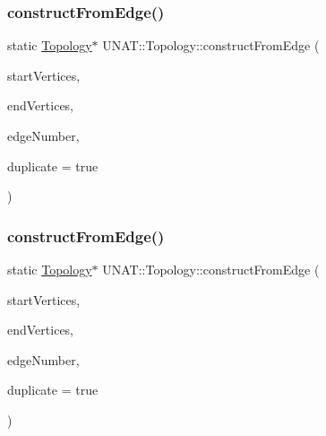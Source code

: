 \subsubsection{\texorpdfstring{constructFromEdge()}{constructFromEdge()}\hspace{0.1cm}{\footnotesize\ttfamily [1/3]}}
{\footnotesize\ttfamily static \mbox{\hyperlink{classUNAT_1_1Topology}{Topology}}$\ast$ U\+N\+A\+T\+::\+Topology\+::construct\+From\+Edge (\begin{DoxyParamCaption}\item[{\mbox{\hyperlink{include_2swMacro_8h_a113cf5f6b5377cdf3fac6aa4e443e9aa}{sw\+Int}} $\ast$}]{start\+Vertices,  }\item[{\mbox{\hyperlink{include_2swMacro_8h_a113cf5f6b5377cdf3fac6aa4e443e9aa}{sw\+Int}} $\ast$}]{end\+Vertices,  }\item[{\mbox{\hyperlink{include_2swMacro_8h_a113cf5f6b5377cdf3fac6aa4e443e9aa}{sw\+Int}}}]{edge\+Number,  }\item[{bool}]{duplicate = {\ttfamily true} }\end{DoxyParamCaption})\hspace{0.3cm}{\ttfamily [static]}}

\mbox{\label{classUNAT_1_1Topology_abe162cf4b45297f8f022db63c11140d1}} 
\subsubsection{\texorpdfstring{constructFromEdge()}{constructFromEdge()}\hspace{0.1cm}{\footnotesize\ttfamily [2/3]}}
{\footnotesize\ttfamily static \mbox{\hyperlink{classUNAT_1_1Topology}{Topology}}$\ast$ U\+N\+A\+T\+::\+Topology\+::construct\+From\+Edge (\begin{DoxyParamCaption}\item[{\mbox{\hyperlink{include_2swMacro_8h_a113cf5f6b5377cdf3fac6aa4e443e9aa}{sw\+Int}} $\ast$}]{start\+Vertices,  }\item[{\mbox{\hyperlink{include_2swMacro_8h_a113cf5f6b5377cdf3fac6aa4e443e9aa}{sw\+Int}} $\ast$}]{end\+Vertices,  }\item[{\mbox{\hyperlink{include_2swMacro_8h_a113cf5f6b5377cdf3fac6aa4e443e9aa}{sw\+Int}}}]{edge\+Number,  }\item[{bool}]{duplicate = {\ttfamily true} }\end{DoxyParamCaption})\hspace{0.3cm}{\ttfamily [static]}}

